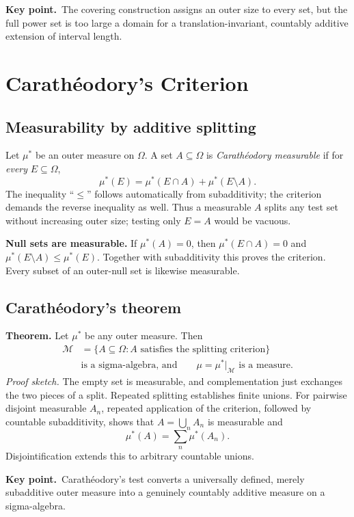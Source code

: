 \documentclass[10pt,a4paper]{article}
\newcommand{\key}[1]{\par\smallskip\textcolor{accent}{\textbf{Key point.}}\ #1\par}
\begin{document}
\key{The covering construction assigns an outer size to every set, but
the full power set is too large a domain for a translation-invariant,
countably additive extension of interval length.}

\section{Carath\'eodory's Criterion}
\subsection{Measurability by additive splitting}
Let $\mu^*$ be an outer measure on $\Omega$. A set $A\subseteq\Omega$
is \emph{Carath\'eodory measurable} if for \emph{every} $E\subseteq\Omega$,
\[
\boxed{\mu^*(E)=\mu^*(E\cap A)+\mu^*(E\setminus A).}
\]
The inequality ``$\le$'' follows automatically from subadditivity;
the criterion demands the reverse inequality as well. Thus a measurable $A$ splits any test set without increasing outer size;
testing only $E=A$ would be vacuous.

\textbf{Null sets are measurable.} If $\mu^*(A)=0$, then
$\mu^*(E\cap A)=0$ and $\mu^*(E\setminus A)\le\mu^*(E)$.
Together with subadditivity this proves the criterion. Every subset
of an outer-null set is likewise measurable.

\subsection{Carath\'eodory's theorem}
\textbf{Theorem.} Let $\mu^*$ be any outer measure. Then
\[
\boxed{\begin{aligned}
\mathcal M&=\{A\subseteq\Omega:A\text{ satisfies the splitting criterion}\}
\\[-2pt]
&\text{is a sigma-algebra, and}\qquad
\mu=\mu^*|_{\mathcal M}\text{ is a measure.}
\end{aligned}}
\]
\emph{Proof sketch.} The empty set is measurable, and complementation
just exchanges the two pieces of a split. Repeated splitting establishes
finite unions. For pairwise disjoint measurable $A_n$, repeated
application of the criterion, followed by countable subadditivity,
shows that $A=\bigcup_nA_n$ is measurable and
\[
\mu^*(A)=\sum_n\mu^*(A_n).
\]
Disjointification extends this to arbitrary countable unions.

\key{Carath\'eodory's test converts a universally defined, merely
subadditive outer measure into a genuinely countably additive measure
on a sigma-algebra.}
\end{document}
